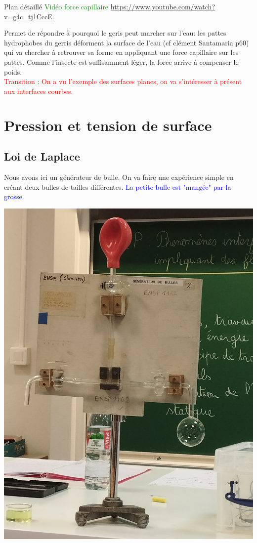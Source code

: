 \begin{reportBlock}{Plan détaillé}
  \textcolor{green}{Vidéo force capillaire }\url{https://www.youtube.com/watch?v=g4c_tj1CccE}.
  
  Permet de répondre à pourquoi le geris peut marcher sur l'eau: les pattes hydrophobes du gerris déforment la surface de l'eau (cf clément Santamaria p60) qui va chercher à retrouver sa forme en appliquant une force capillaire sur les pattes. Comme l'insecte est suffisamment léger, la force arrive à compenser le poids. \\

  \textcolor{red}{Transition : On a vu l'exemple des surfaces planes, on va s'intéresser à présent aux interfaces courbes.}
  
 \section{Pression et tension de surface}
 
 \subsection{Loi de Laplace}
 Nous avons ici un générateur de bulle. On va faire une expérience simple en créant deux bulles de tailles différentes. \textcolor{blue}{La petite bulle est "mangée" par la grosse.}
 \begin{center}
     \includegraphics[scale=0.1]{LP_TensionSurface/Manip_Laplace.jpg}
     

\end{center}
\end{reportBlock}
